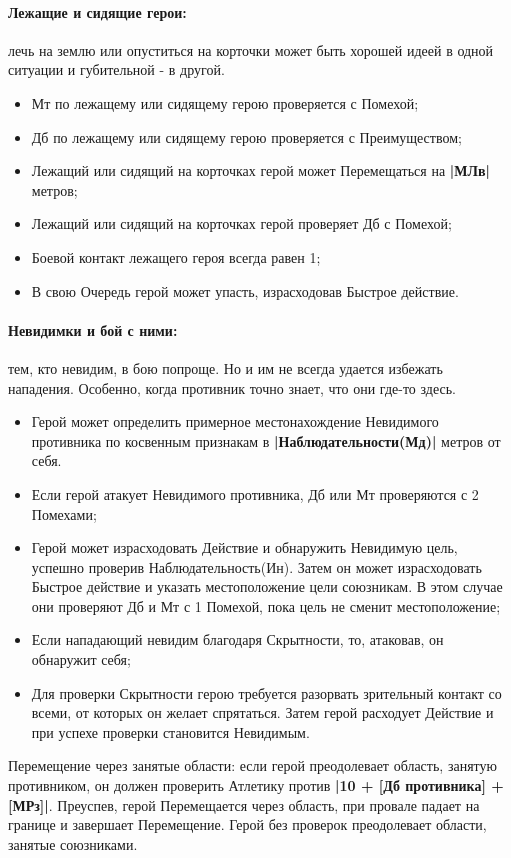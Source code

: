 \paragraph{Лежащие и сидящие герои:} лечь на землю или опуститься на корточки может быть хорошей идеей в одной ситуации и губительной - в другой.
\begin{itemize}
  \item Мт по лежащему или сидящему герою проверяется с Помехой;
  \item Дб по лежащему или сидящему герою проверяется с Преимуществом;
  \item Лежащий или сидящий на корточках герой может Перемещаться на \textbf{|МЛв|} метров;
  \item Лежащий или сидящий на корточках герой проверяет Дб с Помехой;
  \item Боевой контакт лежащего героя всегда равен 1;
  \item В свою Очередь герой может упасть, израсходовав Быстрое действие.
\end{itemize}
\paragraph{Невидимки и бой с ними:} тем, кто невидим, в бою попроще. Но и им не всегда удается избежать нападения. Особенно, когда противник точно знает, что они где-то здесь.
\begin{itemize}
  \item Герой может определить примерное местонахождение Невидимого противника по косвенным признакам в \textbf{|Наблюдательности(Мд)|} метров от себя.
  \item Если герой атакует Невидимого противника, Дб или Мт проверяются с 2 Помехами;
  \item Герой может израсходовать Действие и обнаружить Невидимую цель, успешно проверив Наблюдательность(Ин). Затем он может израсходовать Быстрое действие и указать местоположение цели союзникам. В этом случае они проверяют Дб и Мт с 1 Помехой, пока цель не сменит местоположение;
  \item Если нападающий невидим благодаря Скрытности, то, атаковав, он обнаружит себя;
  \item Для проверки Скрытности герою требуется разорвать зрительный контакт со всеми, от которых он желает спрятаться. Затем герой расходует Действие и при успехе проверки становится Невидимым.
\end{itemize}
Перемещение через занятые области: если герой преодолевает область, занятую противником, он должен проверить Атлетику против \textbf{|10 + [Дб противника] + [МРз]|}. Преуспев, герой Перемещается через область, при провале падает на границе и завершает Перемещение.
\newline Герой без проверок преодолевает области, занятые союзниками.
